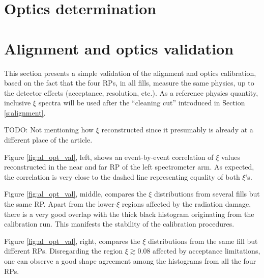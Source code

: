 \documentclass{article}
\def\TODO#1{{\color{red}TODO: #1}}
\begin{document}
\section{Optics determination}
\label{s:optics}



\section{Alignment and optics validation}
\label{s:validataion}

This section presents a simple validation of the alignment and optics calibration, based on the fact that the four RPs, in all fills, measure the same physics, up to the detector effects (acceptance, resolution, etc.). As a reference physics quantity, inclusive $\xi$ spectra will be used after the ``cleaning cut'' introduced in Section \ref{s:alignment}.

\TODO{Not mentioning how $\xi$ reconstructed since it presumably is already at a different place of the article.}

Figure \ref{fig:al_opt_val}, left, shows an event-by-event correlation of $\xi$ values reconstructed in the near and far RP of the left spectrometer arm. As expected, the correlation is very close to the dashed line representing equality of both $\xi$'s.

Figure \ref{fig:al_opt_val}, middle, compares the $\xi$ distributions from several fills but the same RP. Apart from the lower-$\xi$ regions affected by the radiation damage, there is a very good overlap with the thick black histogram originating from the calibration run. This manifests the stability of the calibration procedures.

Figure \ref{fig:al_opt_val}, right, compares the $\xi$ distributions from the same fill but different RPs. Disregarding the region $\xi\gtrsim 0.08$ affected by acceptance limitations, one can observe a good shape agreement among the histograms from all the four RPs.
\end{document}

